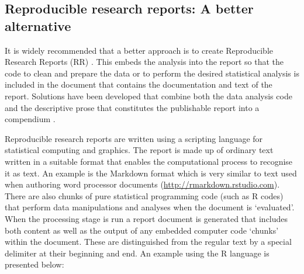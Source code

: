 \documentclass[11pt,a4paper]{article}
\begin{document}
\subsection{Reproducible research reports: A better alternative}

It is widely recommended that a better approach is to create Reproducible Research Reports (RR) \citep{Heal2013}.  This embeds the analysis into the report so that the code to clean and prepare the data or to perform the desired statistical analysis is included in the document that contains the documentation and text of the report. Solutions have been developed that combine both the data analysis code
and the descriptive prose that constitutes the publishable report into
a compendium \citep{Gentleman2004,Schultz}.  

Reproducible research reports are written using a scripting language for
statistical computing and graphics. The report is made up of ordinary
text written in a suitable format that enables the computational process
to recognise it as text. An example is the Markdown format which is
very similar to text used when authoring word processor documents
(\url{http://rmarkdown.rstudio.com}). There are also chunks of pure
statistical programming code (such as R codes) that perform data
manipulations and analyses when the document is `evaluated'. When the
processing stage is run a report document is generated that includes
both content as well as the output of any embedded computer code
`chunks' within the document. These are distinguished from the regular text by a special delimiter at their beginning and end. An example using the R language is presented below:
\clearpage
\end{document}
